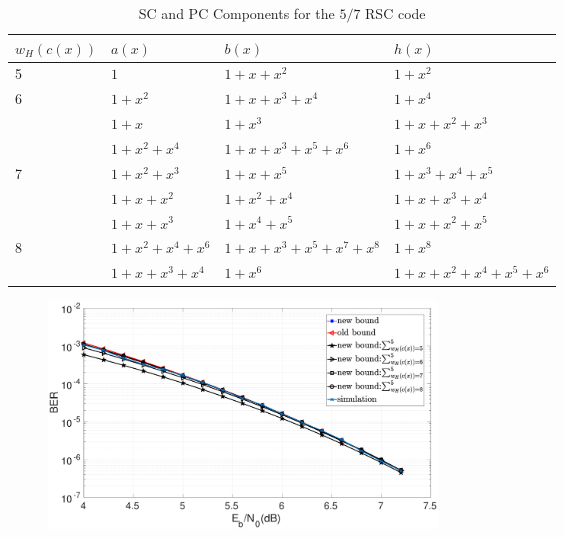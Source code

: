 \begin{example}
\begin{table}[htbp]
	\caption{SC and PC Components for the $5/7$ RSC code}
	\centering
	\begin{tabularx}{0.75\textwidth}{Xlll} 
		\hline
		$w_H(c(x))$& $a(x)$ & $b(x)$ & $h(x)$ \\ %
		\hline\hline
		5&$1$ & $1+x+x^{2}$ & $1+x^2$\\
		\hline\hline
		6&$1+x^2$ & $1+x+x^3+x^4$ & $1+x^{4}$\\
		&$1+x$ & $1+x^3$ & $1+x+x^2+x^3$\\
		\hline\hline
		&$1+x^2+x^4$ & $1+x+x^3+x^5+x^6$ & $1+x^{6}$\\
		7&$1+x^2+x^3$ & $1+x+x^5$ & $1+x^3+x^4+x^5$\\
		&$1+x+x^2$ & $1+x^2+x^4$ & $1+x+x^3+x^4$\\
		&$1+x+x^3$ & $1+x^4+x^5$ & $1+x+x^2+x^5$\\
		\hline \hline
		8&$1+x^2+x^4+x^6$ & $1+x+x^3+x^5+x^7+x^8$ & $1+x^8$\\
		&$1+x+x^3+x^4$ & $1+x^6$ & $1+x+x^2+x^4+x^5+x^6$\\
		\hline
	\end{tabularx}
	
	\label{novelTab13}
\end{table}

\begin{figure}[htbp]
	\centering
	\includegraphics[width=0.5\textwidth]{./Images/RSC_5_7_lower_weights2.eps}
	\label{simFig1}
\end{figure}


\end{example}
